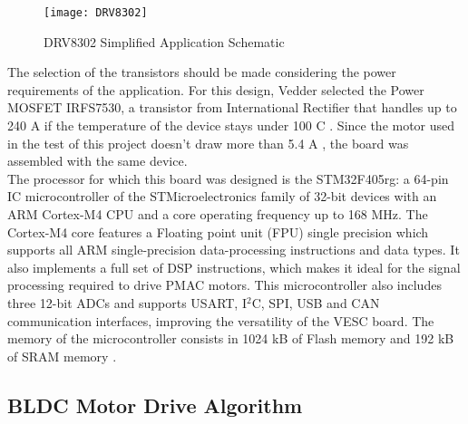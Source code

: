 \begin{figure} [H]
\centering\texttt{[image: DRV8302]}
\caption{DRV8302 Simplified Application Schematic}
\label{fig:DRV8302_simpSch}
\end{figure}

The selection of the transistors should be made considering the power requirements of the application. For this design, Vedder selected the Power MOSFET IRFS7530, a transistor from International Rectifier that handles up to 240 A if the temperature of the device stays under 100 \degree C \cite{TIDRV8302}. Since the motor used in the test of this project doesn't draw more than 5.4 A \cite{BLDCMotorManual}, the board was assembled with the same device.\\

The processor for which this board was designed is the STM32F405rg: a 64-pin IC microcontroller of the STMicroelectronics family of 32-bit devices with an ARM Cortex-M4 CPU and a core operating frequency up to 168 MHz. The Cortex-M4 core features a Floating point unit (FPU) single precision which supports all ARM single-precision data-processing instructions and data types. It also implements a full set of DSP instructions, which makes it ideal for the signal processing required to drive PMAC motors. This microcontroller also includes three 12-bit ADCs and supports USART, I$^2$C, SPI, USB and CAN communication interfaces, improving the versatility of the VESC board. The memory of the microcontroller consists in 1024 kB of Flash memory and 192 kB of SRAM memory \cite{STM32F405Datasheet}.

\subsection{BLDC Motor Drive Algorithm}

